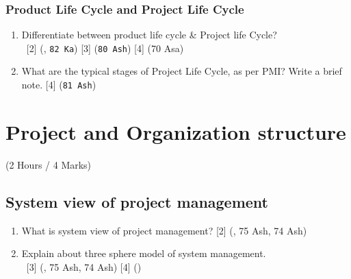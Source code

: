 \documentclass[12pt]{article}
\newcommand{\enter}{\\\textcolor{white}{1}}
\begin{document}
  \subsubsection{Product Life Cycle and Project Life Cycle}
    \begin{enumerate}
      \item Differentiate between product life cycle \& Project life Cycle?
        \enter\hfill [2] (, \texttt{82 Ka}) [3] (\texttt{80 Ash}) [4] (70 Asa)

      \item What are the typical stages of Project Life Cycle, as per PMI? Write a brief note. \hfill [4] (\texttt{81 Ash})
    \end{enumerate}

\pagebreak

\section{Project and Organization structure}
  \begin{center}(2 Hours / 4 Marks)\end{center}

  \subsection{System view of project management}
    \begin{enumerate}
      \item What is system view of project management? \hfill [2] (, 75 Ash, 74 Ash)
      
      \item Explain about three sphere model of system management.
        \enter\hfill [3] (, 75 Ash, 74 Ash) [4] ()
    \end{enumerate}
\end{document}
